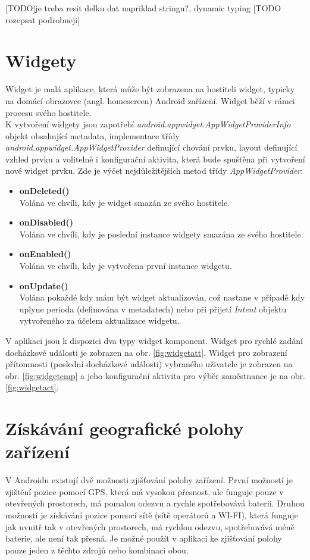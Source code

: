 \documentclass{diplomka}
\begin{document}
[TODO]je treba resit delku dat napriklad stringu?, dynamic typing
[TODO rozepsat podrobneji]



\section{Widgety}
Widget je malá aplikace, která může být zobrazena na hostiteli widget, typicky na domácí obrazovce (angl. homescreen) Android zařízení. Widget běží v rámci procesu svého hostitele.\\ \indent
K vytvoření widgety jsou zapotřebí \emph{android.appwidget.AppWidgetProviderInfo} objekt obsahující metadata,  implementace třídy \emph{android.appwidget.AppWidgetProvider} definující chování prvku, layout definující vzhled prvku a 
volitelně i konfigurační aktivita, která bude spuštěna při vytvoření nové widget prvku. 
Zde je výčet nejdůležitějších metod třídy \emph{AppWidgetProvider}:
\begin{itemize}[]
\item \textbf{onDeleted()}\\
Volána ve chvíli, kdy je widget smazán ze svého hostitele.
\item \textbf{onDisabled()}\\
Volána ve chvíli, kdy je poslední instance widgety smazána ze svého hostitele.
\item \textbf{onEnabled()}\\
Volána ve chvíli, kdy je vytvořena první instance widgetu.
\item \textbf{onUpdate()}\\
Volána pokaždé kdy mám být widget aktualizován, což nastane v případě kdy uplyne perioda (definována v metadatech) nebo při přijetí \emph{Intent} objektu vytvořeného za účelem aktualizace widgetu. 
\end{itemize}

V aplikaci jsou k dispozici dva typy widget komponent. Widget pro rychlé zadání docházkové události je zobrazen na obr. \ref{fig:widgetatt}. Widget pro zobrazení přítomnosti (poslední docházkové události) vybraného uživatele je zobrazen na obr. \ref{fig:widgetemp} a jeho konfigurační aktivita pro výběr zaměstnance je na obr. \ref{fig:widgetact}.


\section{Získávání geografické polohy zařízení}
V Androidu existují dvě možnosti zjišťování polohy zařízení. První možností je zjištění pozice pomocí GPS, která má vysokou přesnost, ale funguje pouze v otevřených prostorech, má pomalou odezvu a rychle spotřebovává baterii. Druhou možností je získávání pozice pomocí sítě (sítě operátorů a WI-FI), která funguje jak uvnitř tak v otevřených prostorech, má rychlou odezvu, spotřebovává méně baterie, ale není tak přesná. Je možné použít v aplikaci ke zjišťování polohy pouze jeden z těchto zdrojů nebo kombinaci obou.
\end{document}
